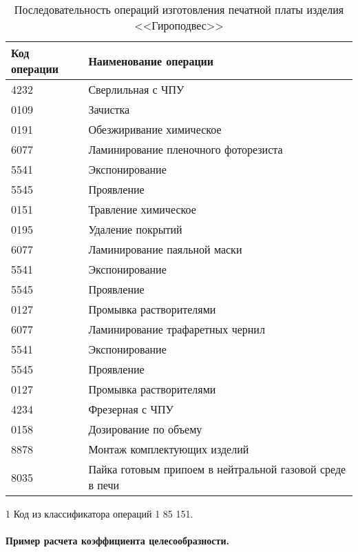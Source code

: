 \begin{table} [!htb]
	\centering
	\caption{Последовательность операций изготовления печатной платы изделия <<Гироподвес>>} \vspace{4pt}
	\label{tab:pcb}
	\begin{threeparttable}
		\begin{tabularx}{\linewidth}{ll}
			\toprule
			\textbf{Код операции\tnote{1}} & \textbf{Наименование операции} \\
			\midrule
			4232 & Сверлильная с ЧПУ \\
			0109 & Зачистка \\
			0191 & Обезжиривание химическое \\
			6077 & Ламинирование пленочного фоторезиста \\
			5541 & Экспонирование \\
			5545 & Проявление \\
			0151 & Травление химическое \\
			0195 & Удаление покрытий \\
			6077 & Ламинирование паяльной маски \\
			5541 & Экспонирование \\
			5545 & Проявление \\
			0127 & Промывка растворителями \\
			6077 & Ламинирование трафаретных чернил \\
			5541 & Экспонирование \\
			5545 & Проявление \\
			0127 & Промывка растворителями \\
			4234 & Фрезерная с ЧПУ \\
			0158 & Дозирование по объему \\
			8878 & Монтаж комплектующих изделий \\ 
			8035 & Пайка готовым припоем в нейтральной газовой среде в печи \\
			\bottomrule
		\end{tabularx}
		\begin{tablenotes} \footnotesize
			\item [1] Код из классификатора операций 1 85 151.
		\end{tablenotes}
	\end{threeparttable}
\end{table}

\paragraph{Пример расчета коэффициента целесообразности.}

